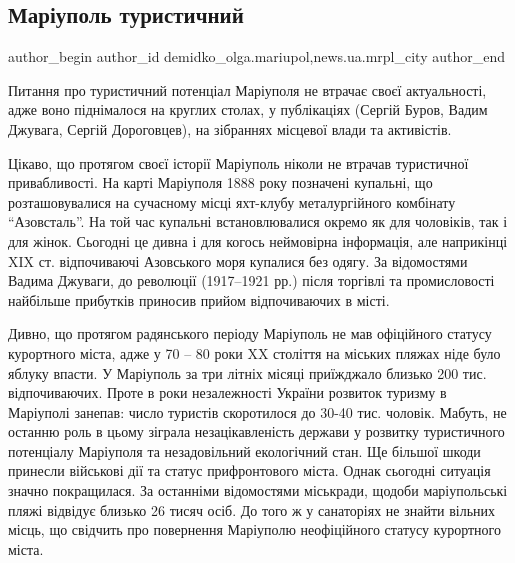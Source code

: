  
 
 
 
 
 
\subsection{Маріуполь туристичний}
\label{sec:23_07_2018.stz.news.ua.mrpl_city.1.mariupol_turystychnyj}
 
\ifcmt
 author_begin
   author_id demidko_olga.mariupol,news.ua.mrpl_city
 author_end
\fi

Питання про туристичний потенціал Маріуполя не втрачає своєї актуальності, адже
воно піднімалося на круглих столах, у публікаціях (Сергій Буров, Вадим Джувага,
Сергій Дороговцев), на зібраннях місцевої влади та активістів.


Цікаво, що протягом своєї історії Маріуполь ніколи не втрачав туристичної
привабливості. На карті Маріуполя 1888 року позначені купальні, що
розташовувалися на сучасному місці яхт-клубу металургійного комбінату
\enquote{Азовсталь}. На той час купальні встановлювалися окремо як для чоловіків, так і
для жінок. Сьогодні це дивна і для когось неймовірна інформація, але наприкінці
XIX ст. відпочиваючі Азовського моря купалися без одягу. За відомостями Вадима
Джуваги, до революції (1917–1921 рр.) після торгівлі та промисловості найбільше
прибутків приносив прийом відпочиваючих в місті.


Дивно, що протягом радянського періоду Маріуполь не мав офіційного статусу
курортного міста, адже у 70 – 80 роки XX століття на міських пляжах ніде було
яблуку впасти. У Маріуполь за три літніх місяці приїжджало близько 200 тис.
відпочиваючих. Проте в роки незалежності України розвиток туризму в Маріуполі
занепав: число туристів скоротилося до 30-40 тис. чоловік. Мабуть, не останню
роль в цьому зіграла незацікавленість держави у розвитку туристичного
потенціалу Маріуполя та незадовільний екологічний стан. Ще більшої шкоди
принесли військові дії та статус прифронтового міста. Однак сьогодні ситуація
значно покращилася. За останніми відомостями міськради, щодоби маріупольські
пляжі відвідує близько 26 тисяч осіб. До того ж у санаторіях не знайти вільних
місць, що свідчить про повернення Маріуполю неофіційного статусу курортного
міста.

